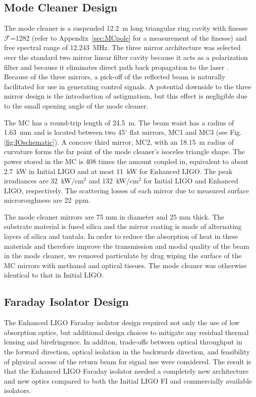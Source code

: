 \subsection{Mode Cleaner Design}
The mode cleaner is a suspended 12.2~m long triangular ring cavity
with finesse $\mathcal{F}$=1282 (refer to Appendix~\ref{sec:MCpole}
for a measurement of the finesse) and free spectral range of
12.243~MHz. The three mirror architecture was selected over the
standard two mirror linear filter cavity because it acts as a
polarization filter and because it eliminates direct path back
propagation to the laser \citep{Raab1992Estimation}. Because of the
three mirrors, a pick-off of the reflected beam is naturally
facilitated for use in generating control signals. A potential
downside to the three mirror design is the introduction of
astigmatism, but this effect is negligible due to the small opening
angle of the mode cleaner.

The MC has a round-trip length of 24.5~m. The beam waist has a radius of
1.63~mm and is located between two 45$^\circ$ flat mirrors, MC1 and
MC3 (see Fig. \ref{fig:IOschematic}). A concave third mirror, MC2,
with an 18.15~m radius of curvature forms the far point of the mode
cleaner's isoceles triangle shape. The power stored in the MC is 408
times the amount coupled in, equivalent to about 2.7~kW in Initial
LIGO and at most 11~kW for Enhanced LIGO. The peak irradiances are
32~kW/cm$^2$ and 132~kW/cm$^2$ for Initial LIGO and Enhanced LIGO,
respectively. The scattering losses of each mirror due to measured
surface microroughness are 22~ppm.

The mode cleaner mirrors are 75 mm in diameter and 25 mm thick. The
substrate material is fused silica and the mirror coating is made of
alternating layers of silica and tantala. In order to reduce the
absorption of heat in these materials and therefore improve the
transmission and modal quality of the beam in the mode cleaner, we
removed particulate by drag wiping the surface of the MC mirrors with
methanol and optical tissues. The mode cleaner was otherwise identical
to that in Initial LIGO.



\subsection{Faraday Isolator Design}
The Enhanced LIGO Faraday isolator design required not only the use of
low absorption optics, but additional design choices to mitigate any
residual thermal lensing and birefringence. In additon, trade-offs
between optical throughput in the forward direction, optical isolation
in the backwards direction, and feasibility of physical access of the
return beam for signal use were considered. The result is that the
Enhanced LIGO Faraday isolator needed a completely new architecture
and new optics compared to both the Initial LIGO FI and commercially
available isolators.


